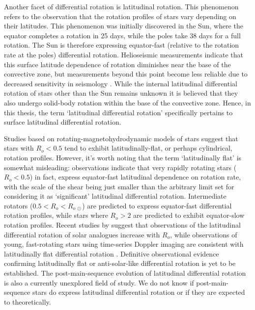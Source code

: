 Another facet of differential rotation is latitudinal rotation.
This phenomenon refers to the observation that the rotation profiles of stars vary depending on their latitudes. 
This phenomenon was initially discovered in the Sun, where the equator completes a rotation in 25 days, while the poles take 38 days for a full rotation. 
The Sun is therefore expressing equator-fast (relative to the rotation rate at the poles) differential rotation.
Helioseismic measurements indicate that this surface latitude dependence of rotation diminishes near the base of the convective zone, but measurements beyond this point become less reliable due to decreased sensitivity in seismology \citep{howe_solar_2009}.
While the internal latitudinal differential rotation of stars other than the Sun remains unknown it is believed that they also undergo solid-body rotation within the base of the convective zone. Hence, in this thesis, the term `latitudinal differential rotation' specifically pertains to surface latitudinal differential rotation.

Studies based on rotating-magnetohydrodynamic models of stars \citep{brun_powering_2022} suggest that stars with $R_o < 0.5$ tend to exhibit latitudinally-flat, or perhaps cylindrical, rotation profiles.
However, it's worth noting that the term `latitudinally flat' is somewhat misleading: observations indicate that very rapidly rotating stars ($R_o < 0.5$) in fact, express equator-fast latitudinal dependence on rotation rate, with the scale of the shear being just smaller than the arbitrary limit set for considering it as `significant' latitudinal differential rotation.
Intermediate rotators ($0.5<R_o< R_{o \ \odot}$) are predicted to express equator-fast differential rotation profiles, while stars where $R_o>2$ are predicted to exhibit equator-slow rotation profiles.
Recent studies by \citet{benomar_asteroseismic_2018} suggest that observations of the latitudinal differential rotation of solar analogues increase with $R_o$, while observations of young, fast-rotating stars using time-series Doppler imaging are consistent with latitudinally flat differential rotation \citep[see, e.g.,][]{lanza_evaluation_1996}.
Definitive observational evidence confirming latitudinally flat or anti-solar-like differential rotation is yet to be established.
The post-main-sequence evolution of latitudinal differential rotation is also a currently unexplored field of study.
We do not know if post-main-sequence stars do express latitudinal differential rotation or if they are expected to theoretically.


